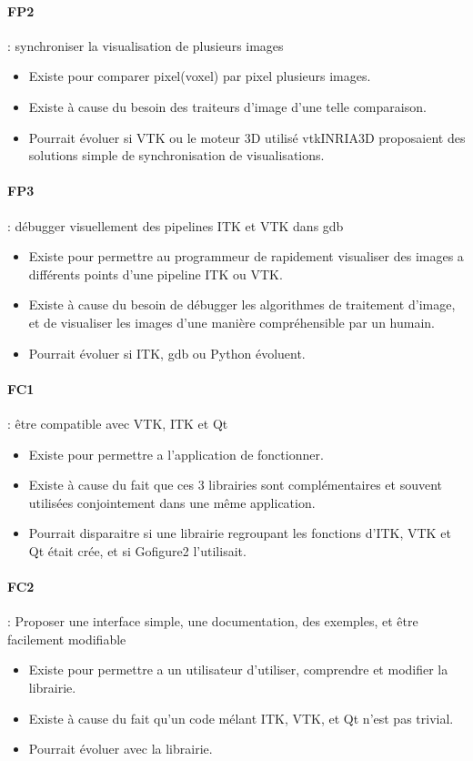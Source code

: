 \paragraph*{FP2} : synchroniser la visualisation de plusieurs images
\begin{itemize}
  \item Existe pour comparer pixel(voxel) par pixel plusieurs images.
  \item Existe à cause du besoin des traiteurs d'image d'une telle comparaison.
  \item Pourrait évoluer si VTK ou le moteur 3D utilisé vtkINRIA3D\cite{vtkINRIA}
  proposaient des solutions simple de synchronisation de visualisations.
\end{itemize}

\paragraph*{FP3} : débugger visuellement des pipelines ITK et VTK dans gdb
\begin{itemize}
  \item Existe pour permettre au programmeur de rapidement visualiser des images a différents points d'une pipeline ITK ou VTK.
  \item Existe à cause du besoin de débugger les algorithmes de traitement d'image,
  et de visualiser les images d'une manière compréhensible par un humain.
  \item Pourrait évoluer si ITK, gdb ou Python évoluent.
\end{itemize}

\paragraph*{FC1} : être compatible avec VTK, ITK et Qt
\begin{itemize}
  \item Existe pour permettre a l'application de fonctionner.
  \item Existe à cause du fait que ces 3 librairies sont complémentaires et souvent utilisées conjointement dans une même application.
  \item Pourrait disparaitre si une librairie regroupant les fonctions d'ITK, VTK et Qt était crée, et si Gofigure2 l'utilisait.
\end{itemize}

\paragraph*{FC2} : Proposer une interface simple, une documentation, des exemples, et être facilement modifiable
\begin{itemize}
  \item Existe pour permettre a un utilisateur d'utiliser, comprendre et modifier la librairie.
  \item Existe à cause du fait qu'un code mélant ITK, VTK, et Qt n'est pas trivial.
  \item Pourrait évoluer avec la librairie.
\end{itemize}

